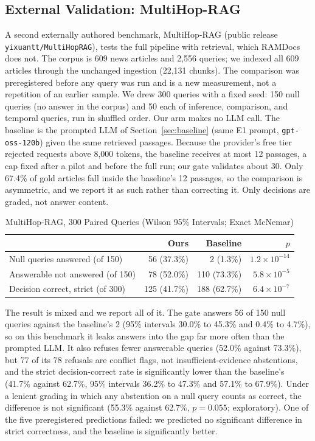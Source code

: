 \documentclass[conference]{IEEEtran}
\begin{document}
\subsection{External Validation: MultiHop-RAG}
\label{sec:multihop}
A second externally authored benchmark, MultiHop-RAG (public release
\texttt{yixuantt/MultiHopRAG}), tests the full pipeline with retrieval, which
RAMDocs does not. The corpus is 609 news articles and 2{,}556 queries; we
indexed all 609 articles through the unchanged ingestion (22{,}131 chunks).
The comparison was preregistered before any query was run and is a new
measurement, not a repetition of an earlier sample. We drew 300 queries with a
fixed seed: 150 null queries (no answer in the corpus) and 50 each of
inference, comparison, and temporal queries, run in shuffled order. Our arm
makes no LLM call. The baseline is the prompted LLM of
Section~\ref{sec:baseline} (same E1 prompt, \texttt{gpt-oss-120b})
given the same retrieved passages. Because the provider's free tier rejected
requests above 8{,}000 tokens, the baseline receives at most 12 passages, a
cap fixed after a pilot and before the full run; our gate validates about 30.
Only 67.4\% of gold articles fall inside the baseline's 12 passages, so the
comparison is asymmetric, and we report it as such rather than correcting it.
Only decisions are graded, not answer content.

\begin{table}[htbp]
\caption{MultiHop-RAG, 300 Paired Queries (Wilson 95\% Intervals; Exact McNemar)}
\label{tab:multihop}
\centering
\small
\begin{tabularx}{\columnwidth}{@{}X r r r@{}}
\toprule
 & Ours & Baseline & $p$ \\
\midrule
Null queries answered (of 150)    & 56 (37.3\%) & 2 (1.3\%)   & $1.2\times10^{-14}$ \\
Answerable not answered (of 150)  & 78 (52.0\%) & 110 (73.3\%) & $5.8\times10^{-5}$ \\
Decision correct, strict (of 300) & 125 (41.7\%) & 188 (62.7\%) & $6.4\times10^{-7}$ \\
\bottomrule
\end{tabularx}
\end{table}

The result is mixed and we report all of it. The gate answers 56 of 150 null
queries against the baseline's 2 (95\% intervals 30.0\% to 45.3\% and 0.4\%
to 4.7\%), so on this benchmark it leaks answers into the gap far more often
than the prompted LLM. It also refuses fewer answerable queries (52.0\%
against 73.3\%), but 77 of its 78 refusals are conflict flags, not
insufficient-evidence abstentions, and the strict decision-correct rate is
significantly lower than the baseline's (41.7\% against 62.7\%, 95\% intervals
36.2\% to 47.3\% and 57.1\% to 67.9\%). Under a lenient grading in which any
abstention on a null query counts as correct, the difference is not
significant (55.3\% against 62.7\%, $p=0.055$; exploratory). One of the five
preregistered predictions failed: we predicted no significant difference in
strict correctness, and the baseline is significantly better.
\end{document}
